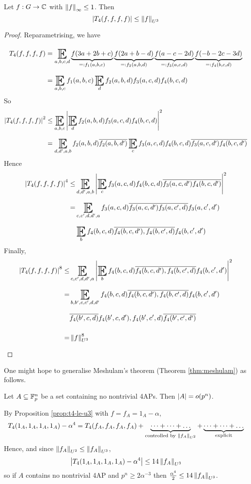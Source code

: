 \documentclass{article}
\begin{document}
\begin{prop}\label{prop:t4-le-u3}
  Let $f : G \to \mathbb C$ with $\left\lVert f\right\rVert_\infty \le 1$. Then
  $$\left\lvert T_4(f, f, f, f)\right\rvert \le \left\lVert f\right\rVert_{U^3}$$
\end{prop}
\begin{proof}
  Reparametrising, we have
  \begin{align*}
    T_4(f, f, f, f)
    & = \E_{a, b, c, d}
    \underbrace{f(3a + 2b + c)}_{=: f_1(a, b, c)}
    \underbrace{f(2a + b - d)}_{=: f_2(a, b, d)}
    \underbrace{f(a - c - 2d)}_{=: f_3(a, c, d)}
    \underbrace{f(-b - 2c - 3d)}_{=: f_4(b, c, d)} \\
    & = \E_{a, b, c} f_1(a, b, c) \E_d f_2(a, b, d) f_3(a, c, d) f_4(b, c, d)
  \end{align*}
  So
  \begin{align*}
    \abs{T_4(f, f, f, f)}^2
    & \le \E_{a, b, c} \abs{\E_d f_2(a, b, d) f_3(a, c, d) f_4(b, c, d)}^2 \\
    & = \E_{d, d', a, b} f_2(a, b, d) \overline{f_2(a, b, d')} \E_c f_3(a, c, d) f_4(b, c, d) \overline{f_3(a, c, d') f_4(b, c, d')}
  \end{align*}
  Hence
  \begin{align*}
    \abs{T_4(f, f, f, f)}^4
    \le & \E_{d, d', a, b} \abs{\E_c f_3(a, c, d) f_4(b, c, d) \overline{f_3(a, c, d') f_4(b, c, d')}}^2 \\
    = & \E_{c, c', d, d', a} f_3(a, c, d) \overline{f_3(a, c, d') f_3(a, c', d)} f_3(a, c', d') \\
    & \E_b f_4(b, c, d) \overline{f_4(b, c, d'), f_4(b, c', d)} f_4(b, c', d')
  \end{align*}
  Finally,
  \begin{align*}
    \abs{T_4(f, f, f, f)}^8
    \le & \E_{c, c', d, d', a} \abs{\E_b f_4(b, c, d) \overline{f_4(b, c, d'), f_4(b, c', d)} f_4(b, c', d')}^2 \\
    = & \E_{b, b', c, c', d, d'} f_4(b, c, d) \overline{f_4(b, c, d'), f_4(b, c', d)} f_4(b, c', d') \\
    & \overline{f_4(b', c, d)} f_4(b', c, d'), f_4(b', c', d) \overline{f_4(b', c', d')} \\
    = & \norm f_{U^3}^8
  \end{align*}
\end{proof}

One might hope to generalise Meshulam's theorem (Theorem \ref{thm:meshulam}) as follows.

\begin{thm}
  Let $A \subseteq \mathbb F_p^n$ be a set containing no nontrivial 4APs. Then $\left\lvert A\right\rvert = o(p^n)$.
\end{thm}
\begin{idea}
  By Proposition \ref{prop:t4-le-u3} with $f = f_A = 1_A - \alpha$,
  $$T_4(1_A, 1_A, 1_A, 1_A) - \alpha^4 = T_4(f_A, f_A, f_A, f_A) + \underbrace{\dots + \dots + \dots}_{\text{controlled by } \left\lVert f_A\right\rVert_{U^2}} + \underbrace{\dots + \dots + \dots}_{\text{explicit}}$$
  Hence, and since $\left\lVert f_A\right\rVert_{U^2} \le \left\lVert f_A\right\rVert_{U^3}$,
  $$\left\lvert T_4(1_A, 1_A, 1_A, 1_A) - \alpha^4\right\rvert \le 14\left\lVert f_A\right\rVert_{U^3}$$
  so if $A$ contains no nontrivial 4AP and $p^n \ge 2\alpha^{-3}$ then $\frac{\alpha^4}2 \le 14\left\lVert f_A\right\rVert_{U^3}$.
\end{idea}
\end{document}
